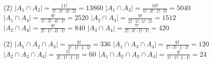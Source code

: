 \documentclass[12pt]{article}
\begin{document}
\begin{enumerate}
    \begin{tasks}[style=itemize, column-sep=0mm, label-align=left, label-offset={0mm}, label-width={3mm}, item-indent={20mm}](2)   
    \task $|A_1\cap A_2| = \frac{11!}{1!\cdot 1!\cdot 4!\cdot 5!} = 13860$
    \task $|A_1\cap A_3| = \frac{10!}{1!\cdot 3!\cdot 1!\cdot 5!} = 5040$
    \task $|A_1\cap A_4| = \frac{9!}{1!\cdot 3!\cdot 4!\cdot 1!} = 2520$
    \task $|A_2\cap A_3| = \frac{9!}{2!\cdot 1!\cdot 1!\cdot 5!} = 1512$
    \task $|A_2\cap A_4| = \frac{8!}{2!\cdot 1!\cdot 4!\cdot 1!} = 840$
    \task $|A_3\cap A_4| = \frac{7!}{2!\cdot 3!\cdot 1!\cdot 1!} = 420$
    \end{tasks}
    
    \begin{tasks}[style=itemize, column-sep=0mm, label-align=left, label-offset={0mm}, label-width={3mm}, item-indent={12mm}](2)   
    \task $|A_1\cap A_2\cap A_3| = \frac{8!}{1!\cdot 1!\cdot 1\cdot 5!}=336$
    \task $|A_1\cap A_3\cap A_4| = \frac{6!}{1!\cdot 3!\cdot 1\cdot 1!}=120$
    \task $|A_2\cap A_3\cap A_4| = \frac{5!}{2!\cdot 1!\cdot 1\cdot 1!}=60$
    \task $|A_1\cap A_2\cap A_3\cap A_4| = \frac{4!}{1!\cdot 1!\cdot 1\cdot 1!}=24$
    \end{tasks}

\end{enumerate}
\end{document}
